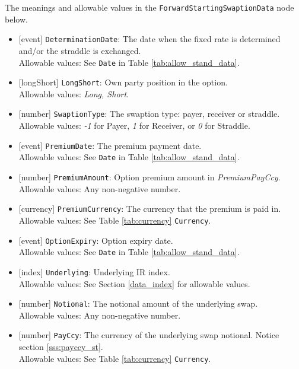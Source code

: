 The meanings and allowable values in the \lstinline!ForwardStartingSwaptionData! node below.
 
\begin{itemize} 
  \item{}[event] \lstinline!DeterminationDate!: The date when the fixed rate is determined and/or the straddle is exchanged. \\
  Allowable values: See \lstinline!Date! in Table \ref{tab:allow_stand_data}.
  \item{}[longShort] \lstinline!LongShort!: Own party position in the option. \\
  Allowable values: \emph{Long, Short}.
  \item{}[number] \lstinline!SwaptionType!: The swaption type: payer, receiver or straddle. \\
  Allowable values: \emph{-1} for Payer, \emph{1} for Receiver, or \emph{0} for Straddle.
  \item{}[event] \lstinline!PremiumDate!: The premium payment date. \\
  Allowable values: See \lstinline!Date! in Table \ref{tab:allow_stand_data}.
  \item{}[number] \lstinline!PremiumAmount!: Option premium amount in \emph{PremiumPayCcy}. \\
  Allowable values: Any non-negative number.
  \item{}[currency] \lstinline!PremiumCurrency!: The currency that the premium is paid in. \\
  Allowable values: See Table \ref{tab:currency} \lstinline!Currency!.
  \item{}[event] \lstinline!OptionExpiry!: Option expiry date. \\
  Allowable values: See \lstinline!Date! in Table \ref{tab:allow_stand_data}. \\
  \item{}[index] \lstinline!Underlying!: Underlying IR index. \\
  Allowable values: See Section \ref{data_index} for allowable values.
  \item{}[number] \lstinline!Notional!: The notional amount of the underlying swap. \\
  Allowable values: Any non-negative number.
  \item{}[number] \lstinline!PayCcy!: The currency of the underlying swap notional. Notice section \ref{sss:payccy_st}. \\
  Allowable values: See Table \ref{tab:currency} \lstinline!Currency!.

\end{itemize}
